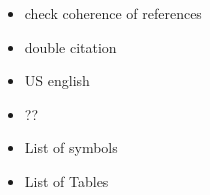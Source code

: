 \begin{itemize}
    \item check coherence of references
    \item double citation
    \item US english 
    \item ??
    \item List of symbols 
    \item List of Tables
    
\end{itemize}
